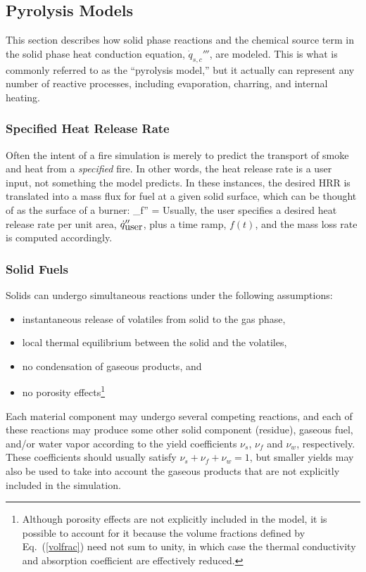 \documentclass[11pt]{book}
\begin{document}
\subsection{Pyrolysis Models}
\label{pyrosection}

This section describes how solid phase reactions and the chemical
source term in the solid phase heat conduction equation,
$\dot{q}_{s,c}'''$,  are modeled. This is what is commonly referred to
as the ``pyrolysis model,'' but it actually can represent any number
of reactive processes, including evaporation, charring, and internal
heating.


\subsubsection{Specified Heat Release Rate}

Often the intent of a fire simulation is merely to predict the
transport of smoke and heat from a {\em specified} fire. In other
words, the heat release rate is a user input, not something the model
predicts. In these instances, the desired HRR is translated into a
mass flux for fuel at a given solid surface, which can be thought of
as the surface of a burner: \be \dm_f'' =  \ee Usually, the user specifies a
desired heat release rate per unit area, $\dot{q}_{\hbox{user}}''$, plus a
time ramp, $f(t)$, and the mass loss rate is computed accordingly.

\subsubsection{Solid Fuels}

Solids can undergo simultaneous reactions under the following assumptions:
\begin{itemize}
\setlength{\itemsep}{0.0in}
\item instantaneous release of volatiles from solid to the gas phase,
\item local thermal equilibrium between the solid and the volatiles,
\item no condensation of gaseous products, and
\item no porosity effects\footnote{Although porosity effects are not explicitly included in the model, it is possible to account for it
because the volume fractions defined by Eq.~(\ref{volfrac}) need not
sum to unity, in which case the thermal conductivity and absorption
coefficient are effectively reduced.}
\end{itemize}
Each material component may undergo several competing reactions, and
each of these reactions may produce some other solid component
(residue), gaseous fuel, and/or water vapor according to
the yield coefficients $\nu_s$, $\nu_f$ and $\nu_w$, respectively.
These coefficients should usually satisfy $\nu_s + \nu_f + \nu_w = 1$,
but smaller yields may also be used to take into account the gaseous
products that are not explicitly included in the simulation.
\end{document}
